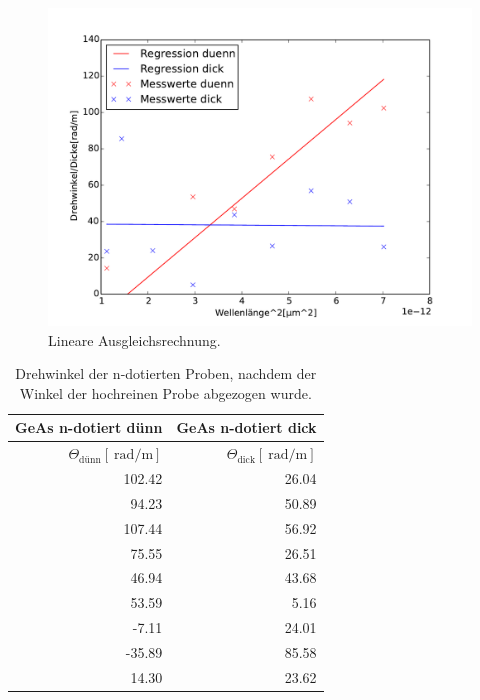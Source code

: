 \begin{figure}
\centering
	\includegraphics[width = 14cm]{data/fit.pdf}
	\caption{Lineare Ausgleichsrechnung.}
	\label{fit}
\end{figure}

\begin{table}
	\centering
	\caption{Drehwinkel der n-dotierten Proben, nachdem der Winkel der hochreinen Probe abgezogen wurde.}
	\begin{tabular}{r r}
		GeAs n-dotiert dünn & GeAs n-dotiert dick\\
		\hline 
		$\Theta_\text{dünn}[\SI{}{\radian\per\meter}]$ & $\Theta_\text{dick}[\SI{}{\radian\per\meter}]$\\
		\hline\hline
		102.42	&	 26.04\\
		 94.23	&	 50.89\\
		107.44	&	 56.92\\
		 75.55	&	 26.51\\
		 46.94	&	 43.68\\
		 53.59	&	  5.16\\
		 -7.11	&	 24.01\\
		-35.89	&	 85.58\\
		 14.30	&	 23.62\\
		 \hline
	\end{tabular}
	\label{wink1}
\end{table}

